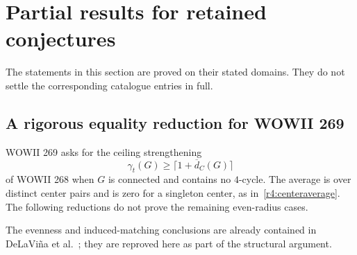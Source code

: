 \documentclass[11pt,a4paper]{article}
\theoremstyle{remark}
\begin{document}
\section{Partial results for retained conjectures}
\label{r8:partials}
The statements in this section are proved on their stated domains.
They do not settle the corresponding catalogue entries in full.

\subsection{A rigorous equality reduction for WOWII 269}
\label{subsec:269-equality-reduction}
WOWII 269 asks for the ceiling strengthening
\[
 \gamma_t(G)\ge\lceil1+\overline d_C(G)\rceil
\]
of WOWII 268 when $G$ is connected and contains no $4$-cycle.
The average is over distinct center pairs and is zero for a singleton
center, as in~\eqref{r4:centeraverage}. The following reductions do
not prove the remaining even-radius cases.

The evenness and induced-matching conclusions are already contained in
DeLaVi\~na et al.~\cite[Theorem~4]{DLPWW2007}; they are reproved here
as part of the structural argument.
\end{document}

